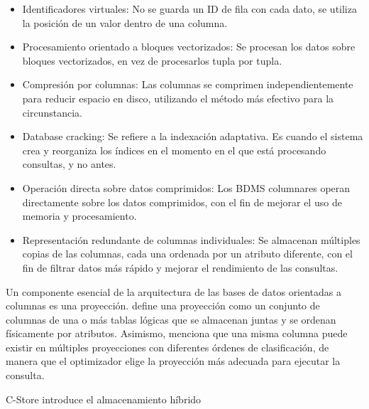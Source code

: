     \begin{itemize}
        \item Identificadores virtuales: No se guarda un ID de fila con cada dato, se utiliza la posición de un valor dentro de una columna.
        \item Procesamiento orientado a bloques vectorizados: Se procesan los datos sobre bloques vectorizados, en vez de procesarlos tupla por tupla.
        \item Compresión por columnas: Las columnas se comprimen independientemente para reducir espacio en disco, utilizando el método más efectivo para la circunstancia.
        \item Database cracking: Se refiere a la indexación adaptativa. Es cuando el sistema crea y reorganiza los índices en el momento en el que está procesando consultas, y no antes.
        \item Operación directa sobre datos comprimidos: Los BDMS columnares operan directamente sobre los datos comprimidos, con el fin de mejorar el uso de memoria y procesamiento.
        \item Representación redundante de columnas individuales: Se almacenan múltiples copias de las columnas, cada una ordenada por un atributo diferente, con el fin de filtrar datos más rápido y mejorar el rendimiento de las consultas.
    \end{itemize}

Un componente esencial de la arquitectura de las bases de datos orientadas a columnas es una proyección. \textcite{matei2010} define una proyección como un conjunto de columnas de una o más tablas lógicas que se almacenan juntas y se ordenan físicamente por atributos. Asimismo, \textcite{stonebraker2005cstore} menciona que una misma columna puede existir en múltiples proyecciones con diferentes órdenes de clasificación, de manera que el optimizador elige la proyección más adecuada para ejecutar la consulta.

C-Store introduce el almacenamiento híbrido